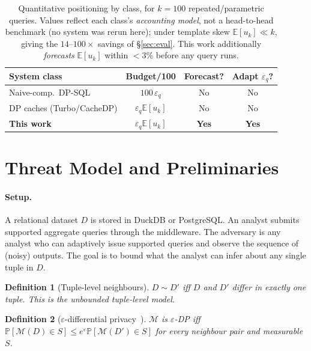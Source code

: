 \documentclass[sigconf,nonacm]{acmart}
\newcommand{\eps}{\varepsilon}
\newcommand{\E}{\mathbb{E}}
\newcommand{\Prob}{\mathbb{P}}
\newtheorem{defn}{Definition}
\begin{document}
\begin{table}[h]
\footnotesize
\centering
\caption{Quantitative positioning by class, for $k{=}100$ repeated/parametric queries. Values reflect each class's \emph{accounting model}, not a head-to-head benchmark (no system was rerun here); under template skew $\E[u_k]\ll k$, giving the $14$--$100\times$ savings of §\ref{sec:eval}. This work additionally \emph{forecasts} $\E[u_k]$ within $<3\%$ before any query runs.}
\label{tab:positioning}
\renewcommand{\arraystretch}{1.15}
\begin{tabular}{p{2.4cm}|c|c|c}
\toprule
System class & Budget/100 & Forecast? & Adapt $\eps_q$? \\
\midrule
Naive-comp.\ DP-SQL & $100\,\eps_q$ & No & No \\
DP caches (Turbo/CacheDP) & $\eps_q\E[u_k]$ & No & No \\
\textbf{This work} & $\eps_q\E[u_k]$ & \textbf{Yes} & \textbf{Yes} \\
\bottomrule
\end{tabular}
\end{table}

\section{Threat Model and Preliminaries}
\label{sec:threat}

\paragraph{Setup.}
A relational dataset $D$ is stored in DuckDB or PostgreSQL. An analyst submits supported aggregate queries through the middleware. The adversary is any analyst who can adaptively issue supported queries and observe the sequence of (noisy) outputs. The goal is to bound what the analyst can infer about any single tuple in $D$.

\begin{defn}[Tuple-level neighbours]
$D \sim D'$ iff $D$ and $D'$ differ in exactly one tuple. This is the unbounded tuple-level model.
\end{defn}

\begin{defn}[$\eps$-differential privacy~\cite{dwork2006calibrating}]
$\mathcal{M}$ is $\eps$-DP iff $\Prob[\mathcal{M}(D)\in S] \leq e^\eps \Prob[\mathcal{M}(D')\in S]$ for every neighbour pair and measurable $S$.
\end{defn}
\end{document}

